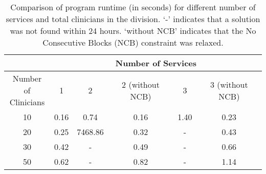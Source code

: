 \begin{table}[htbp]
	\centering
	\begin{tabular}{|c|c||c|c||c|c|}
		\hline
		                                      &  \multicolumn{5}{c|}{Number of Services}  \\ \hline
		\makecell[l]{Number of \\ Clinicians} &  1   &    2    & 2 (without NCB) &  3   & 3 (without NCB) \\ \hline
		                 10                   & 0.16 &  0.74   &  0.16   & 1.40 &  0.23   \\ \hline
		                 20                   & 0.25 & 7468.86 &  0.32   &  -   &  0.43   \\ \hline
		                 30                   & 0.42 &    -    &  0.49   &  -   &  0.66   \\ \hline
		                 50                   & 0.62 &    -    &  0.82   &  -   &  1.14   \\ \hline
	\end{tabular}
	\caption{Comparison of program runtime (in seconds) for different number of services and total clinicians in the division. `-' indicates that a solution was not found within 24 hours. `without NCB' indicates that the No Consecutive Blocks (NCB) constraint was relaxed.}
	\label{tbl:runtime-services-clinicians-comparison}%
\end{table}